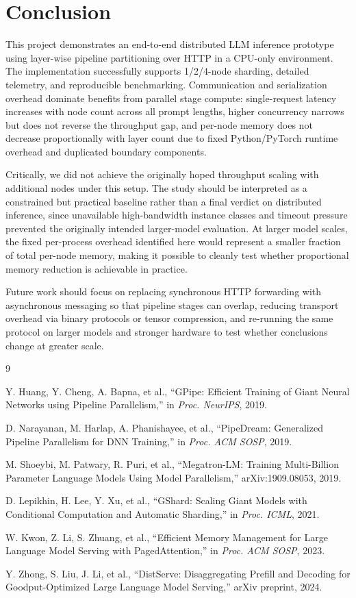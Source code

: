 \documentclass[conference]{IEEEtran}
\begin{document}
\section{Conclusion}
This project demonstrates an end-to-end distributed LLM inference prototype using layer-wise pipeline partitioning over HTTP in a CPU-only environment. The implementation successfully supports 1/2/4-node sharding, detailed telemetry, and reproducible benchmarking. Communication and serialization overhead dominate benefits from parallel stage compute: single-request latency increases with node count across all prompt lengths, higher concurrency narrows but does not reverse the throughput gap, and per-node memory does not decrease proportionally with layer count due to fixed Python/PyTorch runtime overhead and duplicated boundary components.

Critically, we did not achieve the originally hoped throughput scaling with additional nodes under this setup. The study should be interpreted as a constrained but practical baseline rather than a final verdict on distributed inference, since unavailable high-bandwidth instance classes and timeout pressure prevented the originally intended larger-model evaluation. At larger model scales, the fixed per-process overhead identified here would represent a smaller fraction of total per-node memory, making it possible to cleanly test whether proportional memory reduction is achievable in practice.

Future work should focus on replacing synchronous HTTP forwarding with asynchronous messaging so that pipeline stages can overlap, reducing transport overhead via binary protocols or tensor compression, and re-running the same protocol on larger models and stronger hardware to test whether conclusions change at greater scale.

\begin{thebibliography}{9}

Y. Huang, Y. Cheng, A. Bapna, et al.,
``GPipe: Efficient Training of Giant Neural Networks using Pipeline Parallelism,''
in \textit{Proc. NeurIPS}, 2019.

D. Narayanan, M. Harlap, A. Phanishayee, et al.,
``PipeDream: Generalized Pipeline Parallelism for DNN Training,''
in \textit{Proc. ACM SOSP}, 2019.

M. Shoeybi, M. Patwary, R. Puri, et al.,
``Megatron-LM: Training Multi-Billion Parameter Language Models Using Model Parallelism,''
arXiv:1909.08053, 2019.

D. Lepikhin, H. Lee, Y. Xu, et al.,
``GShard: Scaling Giant Models with Conditional Computation and Automatic Sharding,''
in \textit{Proc. ICML}, 2021.

W. Kwon, Z. Li, S. Zhuang, et al.,
``Efficient Memory Management for Large Language Model Serving with PagedAttention,''
in \textit{Proc. ACM SOSP}, 2023.

Y. Zhong, S. Liu, J. Li, et al.,
``DistServe: Disaggregating Prefill and Decoding for Goodput-Optimized Large Language Model Serving,''
arXiv preprint, 2024.

\end{thebibliography}
\end{document}
